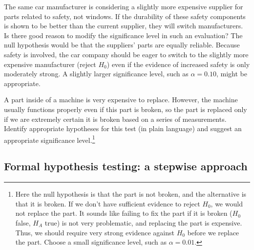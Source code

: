 \begin{example}{The same car manufacturer is considering a slightly more expensive supplier for parts related to safety, not windows. If the durability of these safety components is shown to be better than the current supplier, they will switch manufacturers. Is there good reason to modify the significance level in such an evaluation?}
The null hypothesis would be that the suppliers' parts are equally reliable. Because safety is involved, the car company should be eager to switch to the slightly more expensive manufacturer (reject $H_0$) even if the evidence of increased safety is only moderately strong. A slightly larger significance level, such as $\alpha=0.10$, might be appropriate.
\end{example}

\begin{exercise}
A part inside of a machine is very expensive to replace. However, the machine usually functions properly even if this part is broken, so the part is replaced only if we are extremely certain it is broken based on a series of measurements. Identify appropriate hypotheses for this test (in plain language) and suggest an appropriate significance level.\footnote{Here the null hypothesis is that the part is not broken, and the alternative is that it is broken. If we don't have sufficient evidence to reject $H_0$, we would not replace the part. It sounds like failing to fix the part if it is broken ($H_0$ false, $H_A$ true) is not very problematic, and replacing the part is expensive. Thus, we should require very strong evidence against $H_0$ before we replace the part. Choose a small significance level, such as $\alpha=0.01$.}
\end{exercise}




\subsection{Formal hypothesis testing: a stepwise approach\vspace{-3mm}}


